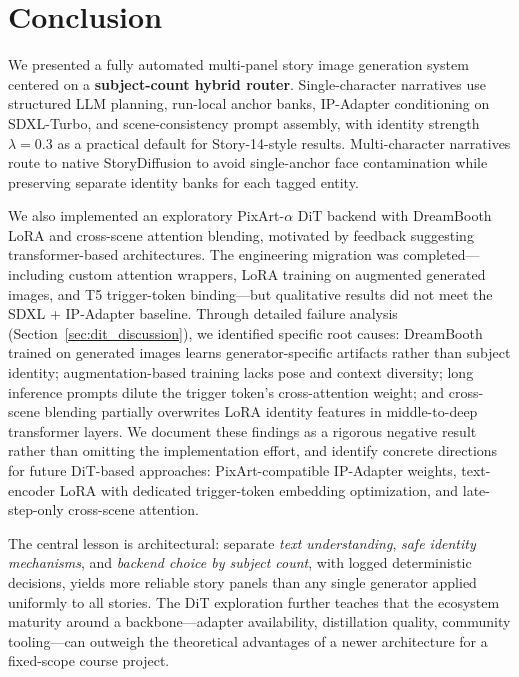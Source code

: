 \section{Conclusion}
\label{sec:conclusion}

We presented a fully automated multi-panel story image generation system centered on a \textbf{subject-count hybrid router}.
Single-character narratives use structured LLM planning, run-local anchor banks, IP-Adapter conditioning on SDXL-Turbo, and scene-consistency prompt assembly, with identity strength $\lambda=0.3$ as a practical default for Story-14-style results.
Multi-character narratives route to native StoryDiffusion to avoid single-anchor face contamination while preserving separate identity banks for each tagged entity.

We also implemented an exploratory PixArt-$\alpha$ DiT backend with DreamBooth LoRA and cross-scene attention blending, motivated by feedback suggesting transformer-based architectures. The engineering migration was completed---including custom attention wrappers, LoRA training on augmented generated images, and T5 trigger-token binding---but qualitative results did not meet the SDXL + IP-Adapter baseline. Through detailed failure analysis (Section~\ref{sec:dit_discussion}), we identified specific root causes: DreamBooth trained on generated images learns generator-specific artifacts rather than subject identity; augmentation-based training lacks pose and context diversity; long inference prompts dilute the trigger token's cross-attention weight; and cross-scene blending partially overwrites LoRA identity features in middle-to-deep transformer layers. We document these findings as a rigorous negative result rather than omitting the implementation effort, and identify concrete directions for future DiT-based approaches: PixArt-compatible IP-Adapter weights, text-encoder LoRA with dedicated trigger-token embedding optimization, and late-step-only cross-scene attention.

The central lesson is architectural: separate \emph{text understanding}, \emph{safe identity mechanisms}, and \emph{backend choice by subject count}, with logged deterministic decisions, yields more reliable story panels than any single generator applied uniformly to all stories. The DiT exploration further teaches that the ecosystem maturity around a backbone---adapter availability, distillation quality, community tooling---can outweigh the theoretical advantages of a newer architecture for a fixed-scope course project.
